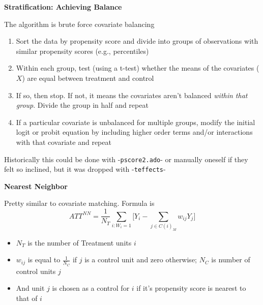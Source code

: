 \documentclass[notes=show]{beamer}
\begin{document}
\begin{frame}[plain]

	\begin{center}
	\textbf{Stratification: Achieving Balance}
	\end{center}
	
The algorithm is brute force covariate balancing
	\begin{enumerate}
		\item Sort the data by propensity score and divide into groups of observations with similar propensity scores (e.g., percentiles)
		\item Within each group, test (using a t-test) whether the means of the covariates ($X$) are equal between treatment and control
		\item If so, then stop.  If not, it means the covariates aren't balanced \emph{within that group}.  Divide the group in half and repeat
		\item If a particular covariate is unbalanced for multiple groups, modify the initial logit or probit equation by including higher order terms and/or interactions with that covariate and repeat
		\end{enumerate}
Historically this could be done with -\texttt{pscore2.ado}- or manually oneself if they felt so inclined, but it was dropped with -\texttt{teffects}-
\end{frame}


\begin{frame}[plain]

	\begin{center}
	\textbf{Nearest Neighbor}
	\end{center}
	
	Pretty similar to covariate matching.  Formula is $$ATT^{NN} = \frac{1}{N_T} \sum_{i:W_i=1} \bigg [ Y_i - \sum_{j \in C(i)_M} w_{ij}Y_j \bigg ]$$ 
		\begin{itemize}
		\item $N_T$ is the number of Treatment units $i$
		\item $w_{ij}$ is equal to $\frac{1}{N_C}$ if $j$ is a control unit and zero otherwise; $N_C$ is number of control units $j$
		\item And unit $j$ is chosen as a control for $i$ if it's propensity score is nearest to that of $i$
		\end{itemize}
\end{frame}
\end{document}
